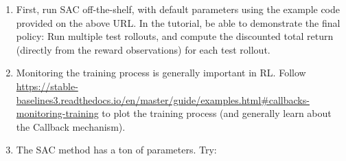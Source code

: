 \begin{enumerate}
\item First, run SAC off-the-shelf, with default parameters using the example code provided on the above URL. In the tutorial, be able to demonstrate the final policy: Run multiple test rollouts, and compute the discounted total return (directly from the reward observations) for each test rollout.

\item Monitoring the training process is generally important in RL. Follow {\urlfont\url{https://stable-baselines3.readthedocs.io/en/master/guide/examples.html#callbacks-monitoring-training}} to plot the training process (and generally learn about the Callback mechanism).

\item The SAC method has a ton of parameters. Try:
\end{enumerate}


\ifthenelse{\isundefined{\scripthead}}{


}{}


\exerfoot
